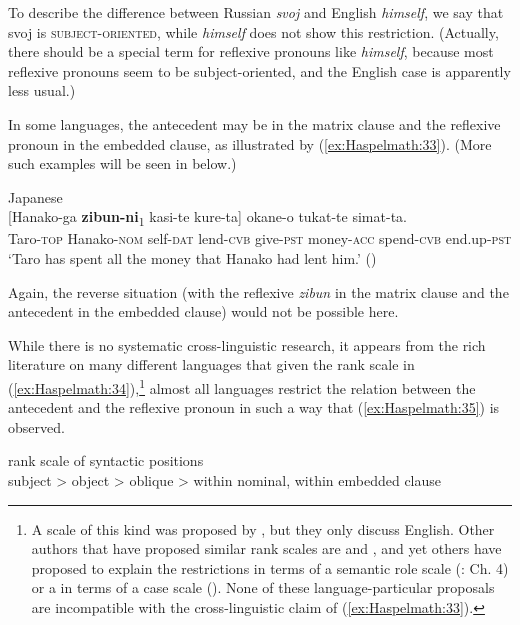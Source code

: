 \documentclass[output=paper]{langscibook}
\begin{document}
To describe the difference between Russian \textit{svoj} and English \textit{himself}, we say that svoj is \textsc{subject-oriented}, while \textit{himself} does not show this restriction. (Actually, there should be a special term for reflexive pronouns like \textit{himself}, because most reflexive pronouns seem to be subject-oriented, and the English case is apparently less usual.)

In some languages, the antecedent may be in the matrix clause and the reflexive pronoun in the embedded clause, as illustrated by (\ref{ex:Haspelmath:33}). (More such examples will be seen in  below.)

\ea%
   Japanese \label{ex:Haspelmath:33}\\
      [{Hanako-ga}  \textbf{{zibun-ni}}{\textsubscript{1}}  {kasi-te}  {kure-ta}]  {okane-o}  {tukat-te}  {simat-ta.}\\
      Taro-\textsc{top}  Hanako-\textsc{nom}  self-\textsc{dat}  lend-\textsc{cvb}  give-\textsc{pst}  money-\textsc{acc}  spend-\textsc{cvb}  end.up-\textsc{pst}   \\
    \glt ‘Taro has spent all the money that Hanako had lent him.’ (\citealt[635]{Kuno1977})
\z


Again, the reverse situation (with the reflexive \textit{zibun} in the matrix clause and the antecedent in the embedded clause) would not be possible here.

  While there is no systematic cross-linguistic research, it appears from the rich literature on many different languages that given the rank scale in (\ref{ex:Haspelmath:34}),\footnote{ {A scale of this kind was proposed by \citet[266]{PollardSag1992}, but they only discuss English. Other authors that have proposed similar rank scales are \citet[212]{Bresnan2001} and \citet[\S7.5]{Vanvalin1997}, and yet others have proposed to explain the restrictions in terms of a semantic role scale (\citealt{Jackendoff1972}: Ch. 4) or a in terms of a case scale (\citealt{Kiss1991}). None of these language-particular proposals are incompatible with the cross-linguistic claim of (\ref{ex:Haspelmath:33}).}} almost all languages restrict the relation between the antecedent and the reflexive pronoun in such a way that (\ref{ex:Haspelmath:35}) is observed. 

\ea%
   rank scale of syntactic positions \label{ex:Haspelmath:34}\\
   subject > object > oblique > within nominal, within embedded clause
\z
\end{document}
